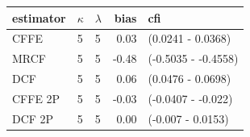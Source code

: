 \begin{tabular}{lllrl}
  \hline
estimator & $\kappa$ & $\lambda$ & bias & cfi \\ 
  \hline
CFFE  & 5 & 5 & 0.03 & (0.0241 - 0.0368) \\ 
  MRCF  & 5 & 5 & -0.48 & (-0.5035 - -0.4558) \\ 
  DCF  & 5 & 5 & 0.06 & (0.0476 - 0.0698) \\ 
  CFFE 2P  & 5 & 5 & -0.03 & (-0.0407 - -0.022) \\ 
  DCF 2P  & 5 & 5 & 0.00 & (-0.007 - 0.0153) \\ 
   \hline
\end{tabular}
